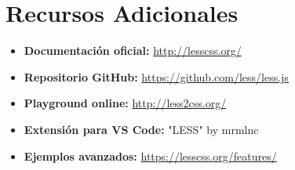 \documentclass[12pt, a4paper]{article}
\begin{document}
\section*{Recursos Adicionales}

\begin{itemize}
  \item \textbf{Documentación oficial:} \url{http://lesscss.org/}
  \item \textbf{Repositorio GitHub:} \url{https://github.com/less/less.js}
  \item \textbf{Playground online:} \url{http://less2css.org/}
  \item \textbf{Extensión para VS Code:} "LESS" by mrmlnc
  \item \textbf{Ejemplos avanzados:} \url{https://lesscss.org/features/}
\end{itemize}
\end{document}
